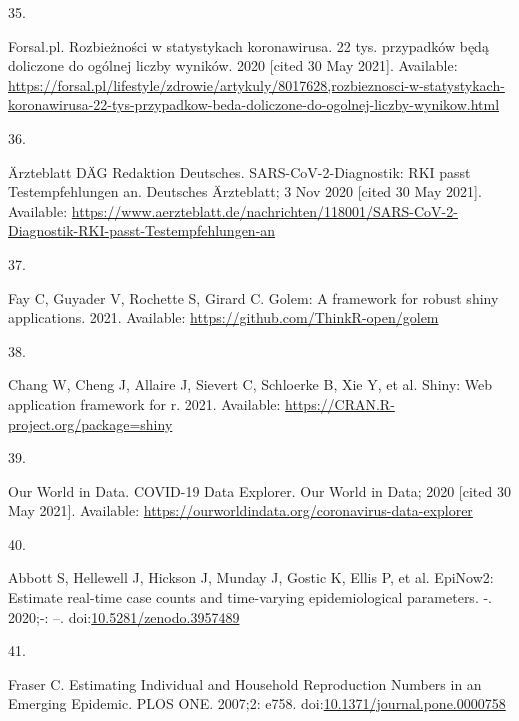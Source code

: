 \documentclass[10pt,letterpaper]{article}
\newlength{\cslhangindent}
\newlength{\csllabelwidth}
\newlength{\cslentryspacingunit} %
\newenvironment{CSLReferences}[2] %
 {%
  \setlength{\parindent}{0pt}
  \ifodd #1
  \let\oldpar\par
  \def\par{\hangindent=\cslhangindent\oldpar}
  \fi
  \setlength{\parskip}{#2\cslentryspacingunit}
 }%
 {}
\newcommand{\CSLLeftMargin}[1]{\parbox[t]{\csllabelwidth}{#1}}
\newcommand{\CSLRightInline}[1]{\parbox[t]{\linewidth - \csllabelwidth}{#1}\break}
\begin{document}
\begin{CSLReferences}{0}{0}
\leavevmode{}%
\CSLLeftMargin{35. }%
\CSLRightInline{Forsal.pl. Rozbieżności w statystykach koronawirusa. 22
tys. przypadków będą doliczone do ogólnej liczby wyników. 2020 {[}cited
30 May 2021{]}. Available:
\url{https://forsal.pl/lifestyle/zdrowie/artykuly/8017628,rozbieznosci-w-statystykach-koronawirusa-22-tys-przypadkow-beda-doliczone-do-ogolnej-liczby-wynikow.html}}

\leavevmode{}%
\CSLLeftMargin{36. }%
\CSLRightInline{Ärzteblatt DÄG Redaktion Deutsches.
SARS-CoV-2-Diagnostik: RKI passt Testempfehlungen an. {Deutsches
Ärzteblatt}; 3 Nov 2020 {[}cited 30 May 2021{]}. Available:
\url{https://www.aerzteblatt.de/nachrichten/118001/SARS-CoV-2-Diagnostik-RKI-passt-Testempfehlungen-an}}

\leavevmode{}%
\CSLLeftMargin{37. }%
\CSLRightInline{Fay C, Guyader V, Rochette S, Girard C. Golem: A
framework for robust shiny applications. 2021. Available:
\url{https://github.com/ThinkR-open/golem}}

\leavevmode{}%
\CSLLeftMargin{38. }%
\CSLRightInline{Chang W, Cheng J, Allaire J, Sievert C, Schloerke B, Xie
Y, et al. Shiny: Web application framework for r. 2021. Available:
\url{https://CRAN.R-project.org/package=shiny}}

\leavevmode{}%
\CSLLeftMargin{39. }%
\CSLRightInline{Our World in Data. {COVID-19 Data Explorer}. {Our World
in Data}; 2020 {[}cited 30 May 2021{]}. Available:
\url{https://ourworldindata.org/coronavirus-data-explorer}}

\leavevmode{}%
\CSLLeftMargin{40. }%
\CSLRightInline{Abbott S, Hellewell J, Hickson J, Munday J, Gostic K,
Ellis P, et al. EpiNow2: Estimate real-time case counts and time-varying
epidemiological parameters. -. 2020;-: --.
doi:\href{https://doi.org/10.5281/zenodo.3957489}{10.5281/zenodo.3957489}}

\leavevmode{}%
\CSLLeftMargin{41. }%
\CSLRightInline{Fraser C. Estimating {Individual} and {Household
Reproduction Numbers} in an {Emerging Epidemic}. PLOS ONE. 2007;2: e758.
doi:\href{https://doi.org/10.1371/journal.pone.0000758}{10.1371/journal.pone.0000758}}


\end{CSLReferences}
\end{document}
